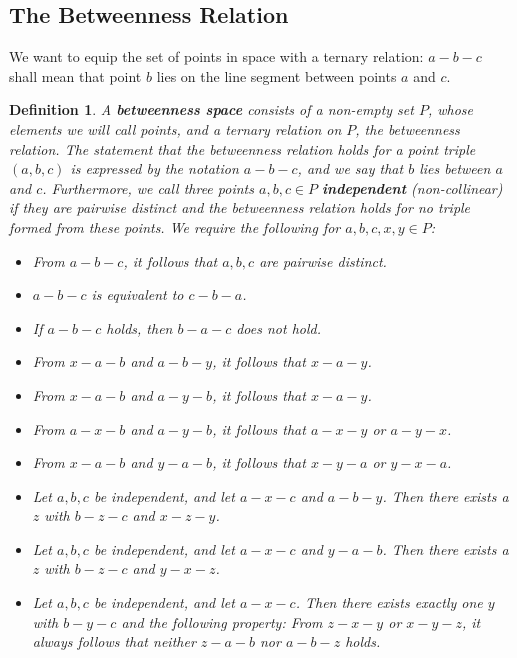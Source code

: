 \documentclass[11pt,a4paper]{article}
\newcommand{\betw}[3]{#1 - #2 - #3}
\newtheorem{definition}[theorem]{Definition}
\begin{document}
\subsection{The Betweenness Relation}

We want to equip the set of points in space with a ternary relation: $\betw{a}{b}{c}$ shall mean that point $b$ lies on the line segment between points $a$ and $c$.

\begin{definition} \label{def:betweenness_space}
A \textbf{betweenness space} consists of a non-empty set $P$, whose elements we will call \textit{points}, and a ternary relation on $P$, the \textit{betweenness relation}. The statement that the betweenness relation holds for a point triple $(a, b, c)$ is expressed by the notation $\betw{a}{b}{c}$, and we say that $b$ lies between $a$ and $c$. Furthermore, we call three points $a, b, c \in P$ \textbf{independent} (non-collinear) if they are pairwise distinct and the betweenness relation holds for no triple formed from these points. We require the following for $a, b, c, x, y \in P$:
\begin{itemize}
    \item[(Z1)] From $\betw{a}{b}{c}$, it follows that $a, b, c$ are pairwise distinct.
    \item[(Z2)] $\betw{a}{b}{c}$ is equivalent to $\betw{c}{b}{a}$.
    \item[(Z3)] If $\betw{a}{b}{c}$ holds, then $\betw{b}{a}{c}$ does not hold.
    \item[(Z4)] From $\betw{x}{a}{b}$ and $\betw{a}{b}{y}$, it follows that $\betw{x}{a}{y}$.
    \item[(Z5)] From $\betw{x}{a}{b}$ and $\betw{a}{y}{b}$, it follows that $\betw{x}{a}{y}$.
    \item[(Z6)] From $\betw{a}{x}{b}$ and $\betw{a}{y}{b}$, it follows that $\betw{a}{x}{y}$ or $\betw{a}{y}{x}$.
    \item[(Z7)] From $\betw{x}{a}{b}$ and $\betw{y}{a}{b}$, it follows that $\betw{x}{y}{a}$ or $\betw{y}{x}{a}$.
    \item[(Z8)] Let $a, b, c$ be independent, and let $\betw{a}{x}{c}$ and $\betw{a}{b}{y}$. Then there exists a $z$ with $\betw{b}{z}{c}$ and $\betw{x}{z}{y}$.
    \item[(Z9)] Let $a, b, c$ be independent, and let $\betw{a}{x}{c}$ and $\betw{y}{a}{b}$. Then there exists a $z$ with $\betw{b}{z}{c}$ and $\betw{y}{x}{z}$.
    \item[(Z10)] Let $a, b, c$ be independent, and let $\betw{a}{x}{c}$. Then there exists exactly one $y$ with $\betw{b}{y}{c}$ and the following property: From $\betw{z}{x}{y}$ or $\betw{x}{y}{z}$, it always follows that neither $\betw{z}{a}{b}$ nor $\betw{a}{b}{z}$ holds.

\end{itemize}
\end{definition}
\end{document}
